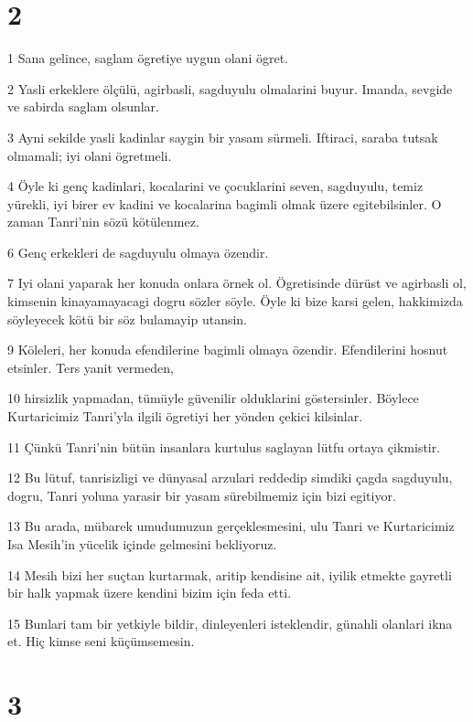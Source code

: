 \chapter{2}

\par 1 Sana gelince, saglam ögretiye uygun olani ögret.
\par 2 Yasli erkeklere ölçülü, agirbasli, sagduyulu olmalarini buyur. Imanda, sevgide ve sabirda saglam olsunlar.
\par 3 Ayni sekilde yasli kadinlar saygin bir yasam sürmeli. Iftiraci, saraba tutsak olmamali; iyi olani ögretmeli.
\par 4 Öyle ki genç kadinlari, kocalarini ve çocuklarini seven, sagduyulu, temiz yürekli, iyi birer ev kadini ve kocalarina bagimli olmak üzere egitebilsinler. O zaman Tanri'nin sözü kötülenmez.
\par 6 Genç erkekleri de sagduyulu olmaya özendir.
\par 7 Iyi olani yaparak her konuda onlara örnek ol. Ögretisinde dürüst ve agirbasli ol, kimsenin kinayamayacagi dogru sözler söyle. Öyle ki bize karsi gelen, hakkimizda söyleyecek kötü bir söz bulamayip utansin.
\par 9 Köleleri, her konuda efendilerine bagimli olmaya özendir. Efendilerini hosnut etsinler. Ters yanit vermeden,
\par 10 hirsizlik yapmadan, tümüyle güvenilir olduklarini göstersinler. Böylece Kurtaricimiz Tanri'yla ilgili ögretiyi her yönden çekici kilsinlar.
\par 11 Çünkü Tanri'nin bütün insanlara kurtulus saglayan lütfu ortaya çikmistir.
\par 12 Bu lütuf, tanrisizligi ve dünyasal arzulari reddedip simdiki çagda sagduyulu, dogru, Tanri yoluna yarasir bir yasam sürebilmemiz için bizi egitiyor.
\par 13 Bu arada, mübarek umudumuzun gerçeklesmesini, ulu Tanri ve Kurtaricimiz Isa Mesih'in yücelik içinde gelmesini bekliyoruz.
\par 14 Mesih bizi her suçtan kurtarmak, aritip kendisine ait, iyilik etmekte gayretli bir halk yapmak üzere kendini bizim için feda etti.
\par 15 Bunlari tam bir yetkiyle bildir, dinleyenleri isteklendir, günahli olanlari ikna et. Hiç kimse seni küçümsemesin.

\chapter{3}


